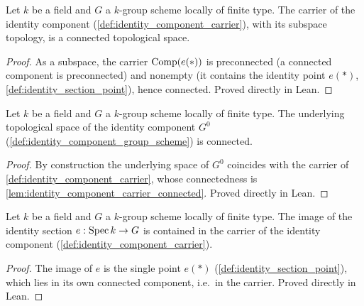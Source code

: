 \begin{lemma}\leanok
  \label{lem:identity_component_carrier_connected}
  Let \(k\) be a field and \(G\) a \(k\)-group scheme locally of finite
  type. The carrier of the identity component
  (\cref{def:identity_component_carrier}), with its subspace topology, is a
  connected topological space.
\end{lemma}
\begin{proof}
  As a subspace, the carrier \(\operatorname{Comp}(e(\ast))\) is preconnected (a
  connected component is preconnected) and nonempty (it contains the
  identity point \(e(\ast)\), \cref{def:identity_section_point}), hence
  connected. Proved directly in Lean.
\end{proof}

\begin{lemma}\leanok
  \label{lem:identity_component_connected}
  Let \(k\) be a field and \(G\) a \(k\)-group scheme locally of finite
  type. The underlying topological space of the identity component
  \(G^0\) (\cref{def:identity_component_group_scheme}) is connected.
\end{lemma}
\begin{proof}
  By construction the underlying space of \(G^0\) coincides with the
  carrier of \cref{def:identity_component_carrier}, whose connectedness is
  \cref{lem:identity_component_carrier_connected}. Proved directly in
  Lean.
\end{proof}

\begin{lemma}\leanok
  \label{lem:identity_component_section_range_subset}
  Let \(k\) be a field and \(G\) a \(k\)-group scheme locally of finite
  type. The image of the identity section \(e : \operatorname{Spec} k \to G\) is
  contained in the carrier of the identity component
  (\cref{def:identity_component_carrier}).
\end{lemma}
\begin{proof}
  The image of \(e\) is the single point \(e(\ast)\)
  (\cref{def:identity_section_point}), which lies in its own connected
  component, i.e.\ in the carrier. Proved directly in Lean.
\end{proof}

